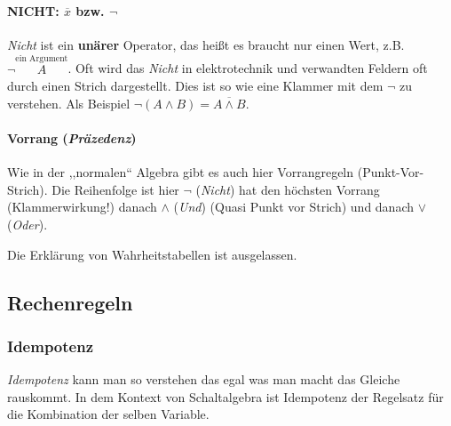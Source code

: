 \documentclass{article}
\begin{document}
\paragraph{NICHT: $\overline{x}$ bzw. $\lnot$}  

\emph{Nicht} ist ein \textbf{unärer} Operator, das heißt es braucht nur einen Wert, z.B. $\lnot \overset{\text{ein Argument}}{A}$. 
Oft wird das \emph{Nicht} in elektrotechnik und verwandten Feldern oft durch einen Strich dargestellt. Dies ist so wie eine Klammer mit dem $\lnot$ zu verstehen. Als Beispiel $\lnot (A \land B)=\overline{A \land B}$.


\paragraph{Vorrang (\emph{Präzedenz})}

Wie in der  ,,normalen`` Algebra gibt es auch hier Vorrangregeln (Punkt-Vor-Strich). 
Die Reihenfolge ist hier $\lnot$ (\emph{Nicht}) hat den höchsten Vorrang (Klammerwirkung!) danach $\land$  (\emph{Und}) (Quasi Punkt vor Strich) und danach $\lor$ (\emph{Oder}). 
 
\begin{info}
    Die Erklärung von Wahrheitstabellen ist ausgelassen.
\end{info}


\subsection{Rechenregeln}

\subsubsection{Idempotenz}

\emph{Idempotenz} kann man so verstehen das egal was man macht das Gleiche rauskommt. In dem Kontext von Schaltalgebra
ist Idempotenz der Regelsatz für die Kombination der selben Variable.
\end{document}
